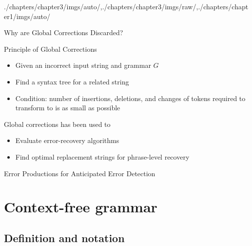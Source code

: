 \begin{graphicspathcontext}{{./chapters/chapter3/imgs/auto/},{./chapters/chapter3/imgs/raw/},{./chapters/chapter1/imgs/auto/}}
\begin{bibunit}[apalike]
\begin{frame}{Why are Global Corrections Discarded?}
	\begin{block}{Principle of Global Corrections}
		\begin{itemize}
			\item Given an incorrect input string  and grammar $G$
			\item Find a syntax tree for a related string 
			\item Condition: number of insertions, deletions, and changes of tokens required to transform  to  is as small as possible
		\end{itemize}
	\end{block}
	\vspace{.25cm}
	\vspace{.25cm}
	\begin{block}{Global corrections has been used to}
		\begin{itemize}
			\item Evaluate error-recovery algorithms
			\item Find optimal replacement strings for phrase-level recovery
		\end{itemize}
	\end{block}
\end{frame}

\begin{frame}{{Error Productions} for Anticipated Error Detection}
	\begin{rightarrowsequence}
	\end{rightarrowsequence}
\end{frame}

\section{Context-free grammar}

\subsection{Definition and notation}
\subsectiontableofcontentslide
	

\end{bibunit}
\end{graphicspathcontext}
